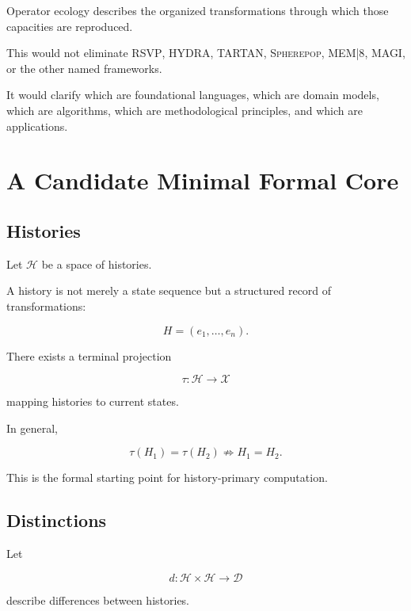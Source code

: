 \documentclass[11pt]{article}
\theoremstyle{remark}
\newcommand{\RSVP}{\textsc{RSVP}}
\newcommand{\HYDRA}{\textsc{HYDRA}}
\newcommand{\TARTAN}{\textsc{TARTAN}}
\newcommand{\MAGI}{\textsc{MAGI}}
\newcommand{\MEM}{\textsc{MEM|8}}
\newcommand{\Spherepop}{\textsc{Spherepop}}
\begin{document}
Operator ecology describes the organized transformations through which those capacities are reproduced.

This would not eliminate \RSVP{}, \HYDRA{}, \TARTAN{}, \Spherepop{}, \MEM{}, \MAGI{}, or the other named frameworks.

It would clarify which are foundational languages, which are domain models, which are algorithms, which are methodological principles, and which are applications.

\section{A Candidate Minimal Formal Core}

\subsection{Histories}

Let $\mathcal{H}$ be a space of histories.

A history is not merely a state sequence but a structured record of transformations:

\begin{equation}
H
=
(e_1,\ldots,e_n).
\end{equation}

There exists a terminal projection

\begin{equation}
\tau:\mathcal{H}\rightarrow\mathcal{X}
\end{equation}

mapping histories to current states.

In general,

\begin{equation}
\tau(H_1)=\tau(H_2)
\not\Rightarrow
H_1=H_2.
\end{equation}

This is the formal starting point for history-primary computation.

\subsection{Distinctions}

Let

\begin{equation}
d:\mathcal{H}\times\mathcal{H}\rightarrow\mathcal{D}
\end{equation}

describe differences between histories.
\end{document}
